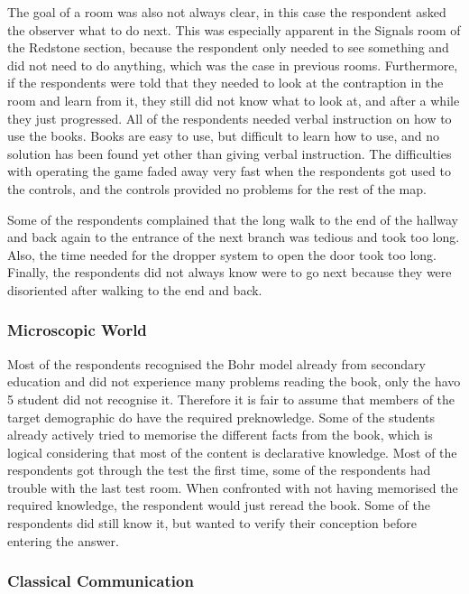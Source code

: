 \documentclass[11pt,twoside]{report} %
\begin{document}
The goal of a room was also not always clear, in this case the respondent asked the observer what to do next. This was especially apparent in the Signals room of the Redstone section, because the respondent only needed to see something and did not need to do anything, which was the case in previous rooms. Furthermore, if the respondents were told that they needed to look at the contraption in the room and learn from it, they still did not know what to look at, and after a while they just progressed. All of the respondents needed verbal instruction on how to use the books. Books are easy to use, but difficult to learn how to use, and no solution has been found yet other than giving verbal instruction. The difficulties with operating the game faded away very fast when the respondents got used to the controls, and the controls provided no problems for the rest of the map.

Some of the respondents complained that the long walk to the end of the hallway and back again to the entrance of the next branch was tedious and took too long. Also, the time needed for the dropper system to open the door took too long. Finally, the respondents did not always know were to go next because they were disoriented after walking to the end and back. 

\subsubsection{Microscopic World}

Most of the respondents recognised the Bohr model already from secondary education and did not experience many problems reading the book, only the havo 5 student did not recognise it. Therefore it is fair to assume that members of the target demographic do have the required preknowledge. Some of the students already actively tried to memorise the different facts from the book, which is logical considering that most of the content is declarative knowledge. Most of the respondents got through the test the first time, some of the respondents had trouble with the last test room. When confronted with not having memorised the required knowledge, the respondent would just reread the book. Some of the respondents did still know it, but wanted to verify their conception before entering the answer.

\subsubsection{Classical Communication}
\end{document}
